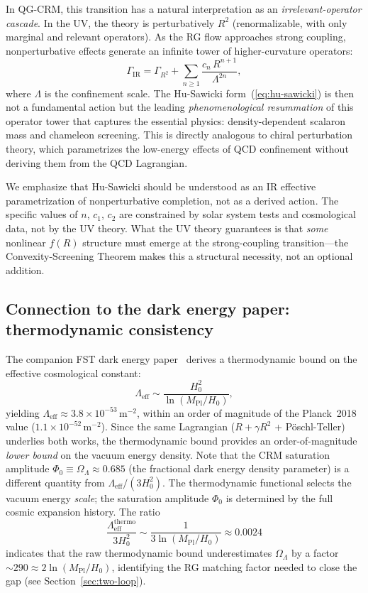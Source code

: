 \documentclass[aps,prd,twocolumn,superscriptaddress,nofootinbib]{revtex4-2}
\begin{document}
In QG-CRM, this transition has a natural interpretation as an \textit{irrelevant-operator cascade}. In the UV, the theory is perturbatively $R^2$ (renormalizable, with only marginal and relevant operators). As the RG flow approaches strong coupling, nonperturbative effects generate an infinite tower of higher-curvature operators:
\begin{equation}
\Gamma_\mathrm{IR} = \Gamma_{R^2} + \sum_{n \geq 1} \frac{c_n\,R^{n+1}}{\Lambda^{2n}},
\end{equation}
where $\Lambda$ is the confinement scale. The Hu-Sawicki form~(\ref{eq:hu-sawicki}) is then not a fundamental action but the leading \textit{phenomenological resummation} of this operator tower that captures the essential physics: density-dependent scalaron mass and chameleon screening. This is directly analogous to chiral perturbation theory, which parametrizes the low-energy effects of QCD confinement without deriving them from the QCD Lagrangian.

We emphasize that Hu-Sawicki should be understood as an IR effective parametrization of nonperturbative completion, not as a derived action. The specific values of $n$, $c_1$, $c_2$ are constrained by solar system tests and cosmological data, not by the UV theory. What the UV theory guarantees is that \textit{some} nonlinear $f(R)$ structure must emerge at the strong-coupling transition---the Convexity-Screening Theorem makes this a structural necessity, not an optional addition.

\subsection{Connection to the dark energy paper: thermodynamic consistency}
\label{sec:de-connection}

The companion FST dark energy paper~\cite{GeigerDE2026} derives a thermodynamic bound on the effective cosmological constant:
\begin{equation}
\Lambda_\mathrm{eff} \sim \frac{H_0^2}{\ln(M_\mathrm{Pl}/H_0)},
\label{eq:lambda-bound}
\end{equation}
yielding $\Lambda_\mathrm{eff} \approx 3.8 \times 10^{-53}\,\mathrm{m}^{-2}$, within an order of magnitude of the Planck~2018 value ($1.1 \times 10^{-52}\,\mathrm{m}^{-2}$). Since the same Lagrangian ($R + \gamma R^2$ + P\"oschl-Teller) underlies both works, the thermodynamic bound provides an order-of-magnitude \textit{lower bound} on the vacuum energy density. Note that the CRM saturation amplitude $\Phi_0 \equiv \Omega_\Lambda \approx 0.685$ (the fractional dark energy density parameter) is a different quantity from $\Lambda_\mathrm{eff}/(3H_0^2)$. The thermodynamic functional selects the vacuum energy \textit{scale}; the saturation amplitude $\Phi_0$ is determined by the full cosmic expansion history. The ratio
\begin{equation}
\frac{\Lambda_\mathrm{eff}^\mathrm{thermo}}{3H_0^2} \sim \frac{1}{3\ln(M_\mathrm{Pl}/H_0)} \approx 0.0024
\end{equation}
indicates that the raw thermodynamic bound underestimates $\Omega_\Lambda$ by a factor $\sim 290 \approx 2\ln(M_\mathrm{Pl}/H_0)$, identifying the RG matching factor needed to close the gap (see Section~\ref{sec:two-loop}).
\end{document}
